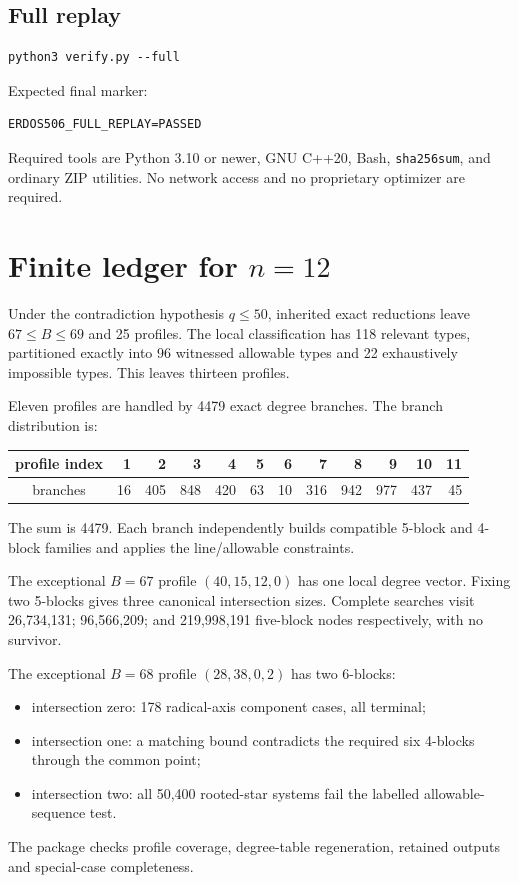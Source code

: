 \documentclass[11pt]{article}
\begin{document}
\subsection{Full replay}
\begin{verbatim}
python3 verify.py --full
\end{verbatim}
Expected final marker:
\begin{verbatim}
ERDOS506_FULL_REPLAY=PASSED
\end{verbatim}
Required tools are Python 3.10 or newer, GNU C++20, Bash, \texttt{sha256sum}, and ordinary ZIP utilities.  No network access and no proprietary optimizer are required.

\section{Finite ledger for $n=12$}

Under the contradiction hypothesis $q\le50$, inherited exact reductions leave $67\le B\le69$ and 25 profiles.  The local classification has 118 relevant types, partitioned exactly into 96 witnessed allowable types and 22 exhaustively impossible types.  This leaves thirteen profiles.

Eleven profiles are handled by 4479 exact degree branches.  The branch distribution is:
\begin{center}
\begin{tabular}{c|rrrrrrrrrrr}
profile index & 1&2&3&4&5&6&7&8&9&10&11\\
\hline
branches & 16&405&848&420&63&10&316&942&977&437&45
\end{tabular}
\end{center}
The sum is 4479.  Each branch independently builds compatible 5-block and 4-block families and applies the line/allowable constraints.

The exceptional $B=67$ profile $(40,15,12,0)$ has one local degree vector.  Fixing two 5-blocks gives three canonical intersection sizes.  Complete searches visit 26,734,131; 96,566,209; and 219,998,191 five-block nodes respectively, with no survivor.

The exceptional $B=68$ profile $(28,38,0,2)$ has two 6-blocks:
\begin{itemize}
\item intersection zero: 178 radical-axis component cases, all terminal;
\item intersection one: a matching bound contradicts the required six 4-blocks through the common point;
\item intersection two: all 50,400 rooted-star systems fail the labelled allowable-sequence test.
\end{itemize}
The package checks profile coverage, degree-table regeneration, retained outputs and special-case completeness.
\end{document}
